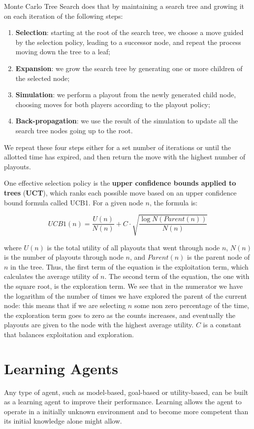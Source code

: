 \documentclass{article}
\begin{document}
Monte Carlo Tree Search does that by maintaining a search tree and growing it on each iteration of the following steps:
\begin{enumerate}
    \item \textbf{Selection}: starting at the root of the search tree, we choose a move guided by the selection policy, leading to a successor node, and repeat the process moving down the tree to a leaf;
    \item \textbf{Expansion}: we grow the search tree by generating one or more children of the selected node;
    \item \textbf{Simulation}: we perform a playout from the newly generated child node, choosing moves for both players according to the playout policy;
    \item \textbf{Back-propagation}: we use the result of the simulation to update all the search tree nodes going up to the root.
\end{enumerate}

We repeat these four steps either for a set number of iterations or until the allotted time has expired, and then return the move with the highest number of playouts.

One effective selection policy is the \textbf{upper confidence bounds applied to trees} (\textbf{UCT}), which ranks each possible move based on an upper confidence bound formula called UCB1. For a given node \(n\), the formula is:

\[UCB1(n) = \frac{U(n)}{N(n)}+C\cdot\sqrt{\frac{\log{N(Parent(n))}}{N(n)}}\]

\noindent where \(U(n)\) is the total utility of all playouts that went through node \(n\), \(N(n)\) is the number of playouts through node \(n\), and \(Parent(n)\) is the parent node of \(n\) in the tree. Thus, the first term of the equation is the exploitation term, which calculates the average utility of \(n\). The second term of the equation, the one with the square root, is the exploration term. We see that in the numerator we have the logarithm of the number of times we have explored the parent of the current node: this means that if we are selecting \(n\) some non zero percentage of the time, the exploration term goes to zero as the counts increases, and eventually the playouts are given to the node with the highest average utility. \(C\) is a constant that balances exploitation and exploration.

\newpage
\section{Learning Agents}
Any type of agent, such as model-based, goal-based or utility-based, can be built as a learning agent to improve their performance. Learning allows the agent to operate in a initially unknown environment and to become more competent than its initial knowledge alone might allow. 
\end{document}
